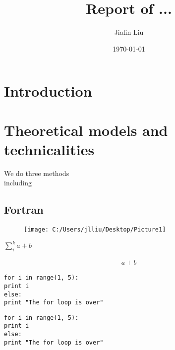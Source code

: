 \documentclass{article}
\begin{document}
\lstset{language=Pascal}          %
\title{Report of ...}
\author{Jialin Liu}
\date{\today}
\maketitle

\newpage

\section{Introduction}
\section{Theoretical models and technicalities}
We do three methods \\
including
\subsection{Fortran}	

\begin{figure}[h]
	\centering
	\texttt{[image: C:/Users/jlliu/Desktop/Picture1]}
	\caption{}
	\label{fig:Picture1}
\end{figure}

$\sum_i^k{a+b}$ 

\begin{align*}
a+b
\end{align*}



\begin{verbatim}
for i in range(1, 5):
print i
else:
print "The for loop is over"
\end{verbatim}



\begin{lstlisting}[frame=single]  
for i in range(1, 5):
print i
else:
print "The for loop is over"
\end{lstlisting}
\end{document}
